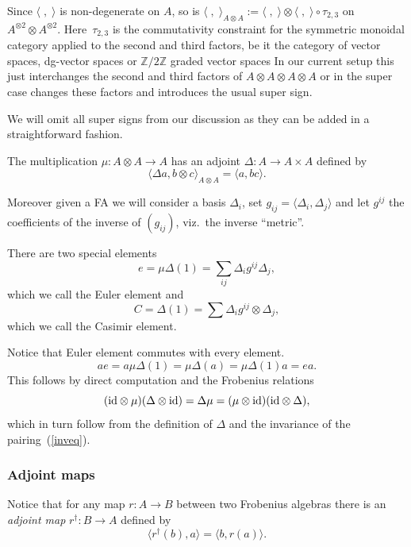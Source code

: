 \documentclass[pdftex]{sigma}
\def\Z{\mathbb Z}
\begin{document}
Since $ \langle \; ,\;\rangle$ is non-degenerate on $A$, so is $
\langle \; ,\;\rangle_{A\otimes A}:=\langle \; ,\;\rangle\otimes
\langle \; ,\;\rangle\circ \tau_{2,3}$ on $A^{\otimes 2}\otimes
A^{\otimes 2}$. Here~$\tau_{2,3}$ is the commutativity constraint
for the symmetric monoidal category applied to the second and third
factors, be it the category of vector spaces, dg-vector spaces or
$\Z/2\Z$ graded vector spaces
 In our current setup this just interchanges the second and third  factors of
$A\otimes A\otimes A\otimes A$  or in the super case changes these factors and introduces
the usual super sign.

We will omit all super signs from our discussion as they can be added in a straightforward fashion.

The multiplication $\mu:A\otimes A\to A$ has an adjoint $\Delta: A\to A\times A$
def\/ined by
\begin{equation}
\label{inveq} \langle \Delta a, b\otimes c\rangle_{A\otimes
A}=\langle a,bc\rangle.
\end{equation}

Moreover given a FA we will consider a basis $\Delta_i$, set $g_{ij}=\langle \Delta_i,\Delta_j\rangle$
and let $g^{ij}$ the coef\/f\/icients of the inverse of $(g_{ij})$, viz.\ the inverse ``metric''.

There are two special elements
\begin{equation*}
e=\mu\Delta(1)=\sum_{ij} \Delta_i g^{ij}\Delta_j,
\end{equation*}
which we call the Euler element and
\begin{equation*}
C=\Delta(1)=\sum \Delta_i g^{ij} \otimes \Delta_j,
\end{equation*}
which we call the Casimir element.

Notice that Euler element commutes with every element.
\begin{equation*}
ae=a\mu\Delta(1)=\mu\Delta(a)=\mu\Delta(1)a=ea.
\end{equation*}
This follows by direct computation and the Frobenius relations
\begin{equation*}
({\rm id}\otimes \mu)(\Delta\otimes {\rm id})=\Delta\mu=(\mu\otimes
{\rm id})({\rm id}\otimes \Delta),
\end{equation*}
which in turn follow from the def\/inition of $\Delta$ and the
invariance of the pairing~(\ref{inveq}).

\subsubsection{Adjoint maps}
Notice that for any map $r:A\to B$ between two Frobenius algebras
there is an {\em adjoint map} $r^{\dagger}:B\to A$ def\/ined by
\begin{equation*}
 \langle r^{\dagger}(b) ,a  \rangle =\langle b,r(a)\rangle.
\end{equation*}
\end{document}
